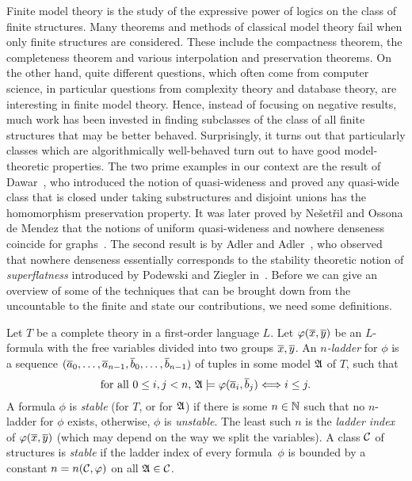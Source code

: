 Finite model theory is the study of the expressive power 
of logics on the class of finite structures. Many theorems and 
methods of classical model theory fail when only finite structures 
are considered. These include the compactness theorem, the completeness 
theorem and various interpolation and preservation theorems.
On the other hand, quite different questions, which often come from
computer science, in particular questions from complexity theory and database
theory, are interesting in finite model theory. Hence, instead of focusing 
on negative results, much work has been invested in finding 
subclasses of the class of all finite structures that may be better behaved.
Surprisingly, it turns out that particularly classes which are 
algorithmically well-behaved turn out to have good model-theoretic 
properties. The two prime examples in our context are the result of 
Dawar~\cite{dawar2010homomorphism}, who introduced the notion of
quasi-wideness and proved any quasi-wide class that is closed under taking substructures
and disjoint unions has the homomorphism preservation property. It was 
later proved by Ne\v{s}et\v{r}il and Ossona de Mendez that 
the notions of uniform quasi-wideness and nowhere denseness coincide for 
graphs~\cite{nevsetvril2011nowhere}. The second result is by 
Adler and Adler~\cite{adler2014interpreting}, who observed that 
nowhere denseness essentially corresponds to the stability theoretic notion 
of \emph{superflatness} introduced by Podewski and 
Ziegler in~\cite{podewski1978stable}. Before we can give an 
overview of some of the techniques that can be brought down from 
the uncountable to the finite and state our contributions, we need some
definitions. 

\begin{definition}
Let $T$ be a complete theory in a first-order language $L$. Let 
$\varphi(\overline{x},\overline{y})$ be an $L$-formula with the free variables
divided into two groups $\overline{x}, \overline{y}$. An \emph{$n$-ladder}
for $\phi$ is a sequence $(\overline{a}_0,\ldots, \overline{a}_{n-1},
\overline{b}_0,\ldots, \overline{b}_{n-1})$ of tuples in some model $\mathfrak{A}$
of $T$, such that
\[\text{for all $0\leq i,j<n$, }\mathfrak{A}\models\varphi(\overline{a}_i,\overline{b}_j)\Longleftrightarrow i\leq j. \]
A formula $\phi$ is \emph{stable} (for $T$, or for $\mathfrak{A}$) if there is 
some $n\in \mathbb{N}$ such that no $n$-ladder for $\phi$ exists, otherwise, 
$\phi$ is \emph{unstable}. The least such $n$ is the \emph{ladder index}
of $\varphi(\overline{x},\overline{y})$ (which may depend on the way we split the
variables). A class $\mathcal{C}$ of structures is \emph{stable} if the ladder index
of every formula~$\phi$ is bounded by a constant $n=n(\mathcal{C},\varphi)$
on all $\mathfrak{A}\in \mathcal{C}$.
\end{definition}

